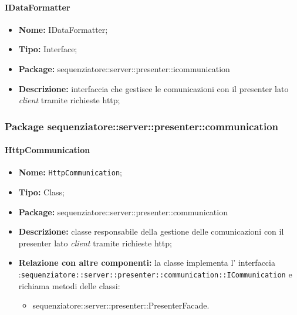 \paragraph{IDataFormatter}
	\begin{itemize}
		\item \textbf{Nome:} IDataFormatter;
		\item \textbf{Tipo:} Interface;
		\item \textbf{Package:} sequenziatore::server::presenter::icommunication
		\item \textbf{Descrizione:} interfaccia che gestisce le comunicazioni con il presenter lato \textit{client} tramite richieste http;
	\end{itemize}
\subsubsection{Package sequenziatore::server::presenter::communication}
\paragraph{HttpCommunication}
	\begin{itemize}
		\item \textbf{Nome:} \texttt{HttpCommunication};
		\item \textbf{Tipo:} Class;
		\item \textbf{Package:} sequenziatore::server::presenter::communication
		\item \textbf{Descrizione:} classe responsabile della gestione delle comunicazioni con il presenter lato \textit{client} tramite richieste http;
		\item \textbf{Relazione con altre componenti:} la classe implementa l' interfaccia :\texttt{sequenziatore::server::presenter::communication::ICommunication} e richiama metodi delle classi:
		\begin{itemize}
			\item sequenziatore::server::presenter::PresenterFacade.
		\end{itemize}
	\end{itemize}
